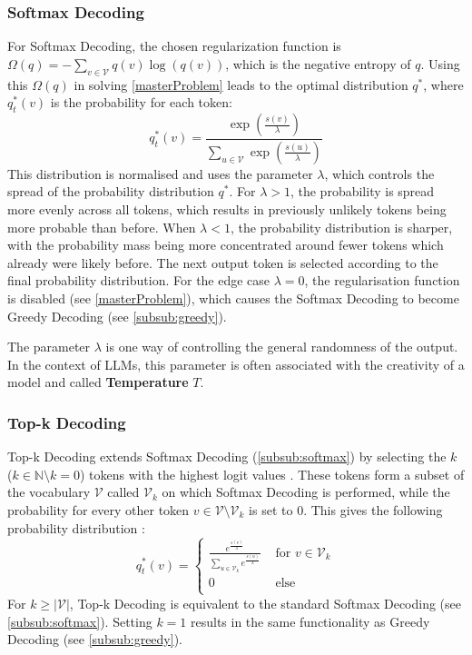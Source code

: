 \documentclass[
	fontsize = 11pt,
	paper = a4,
	draft = false,
	twoside = true,
	titlepage = false
]{scrartcl}
\numberwithin{equation}{subsection}
\begin{document}
	\subsubsection{Softmax Decoding} \label{subsub:softmax}
	For Softmax Decoding, the chosen regularization function is $\Omega(q) = - \sum_{v \in \mathcal{V}} q(v) \log(q(v))$, which is the negative entropy of $q$. Using this $\Omega(q)$ in solving \autoref{masterProblem} leads to the optimal distribution $q^*$, where $q_t^*(v)$ is the probability for each \gls{token}: \autocite[p.~10-12]{llmDetail}
	\begin{equation}
		q_t^*(v) = \frac{\exp(\frac{s(v)}{\lambda})}{\sum_{u \in \mathcal{V}}\exp(\frac{s(u)}{\lambda})}
	\end{equation}
	This distribution is normalised and uses the parameter $\lambda$, which controls the spread of the probability distribution $q^*$. For $\lambda > 1$, the probability is spread more evenly across all \glspl{token}, which results in previously unlikely \glspl{token} being more probable than before. When $\lambda < 1$, the probability distribution is sharper, with the probability mass being more concentrated around fewer \glspl{token} which already were likely before. The next output \gls{token} is selected according to the final probability distribution.
	For the edge case $\lambda = 0$, the regularisation function is disabled (see \autoref{masterProblem}), which causes the Softmax Decoding to become Greedy Decoding (see \autoref{subsub:greedy}). \autocite[p.~10-12]{llmDetail}
	
	The parameter $\lambda$ is one way of controlling the general randomness of the output. In the context of \gls{LLM}s, this parameter is often associated with the creativity of a model and called \textbf{Temperature} $T$. \autocite[p.~10-12]{llmDetail}
	
	\subsubsection{Top-k Decoding} \label{subsub:topk}
	Top-k Decoding extends Softmax Decoding (\autoref{subsub:softmax}) by selecting the $k$ ($k \in \mathbb{N} \setminus k = 0$) \glspl{token} with the highest \gls{logit} values \autocite[p.~12]{llmDetail}. These \glspl{token} form a subset of the vocabulary $\mathcal{V}$ called $\mathcal{V}_k$ on which Softmax Decoding is performed, while the probability for every other \gls{token} $v \in \mathcal{V} \setminus \mathcal{V}_k$ is set to $0$.
	This gives the following probability distribution \autocite[p.~12]{llmDetail}:
	\begin{equation}
		q_t^*(v) = \begin{cases}
			\frac{e^{\frac{s(v)}{\lambda}}}{\sum_{u \in \mathcal{V}_k}e^{\frac{s(u)}{\lambda}}} & \text{ for } v \in \mathcal{V}_k\\
			0 & \text{ else }\\
		\end{cases}
	\end{equation}
	For $k \geq \lvert\mathcal{V}\rvert$, Top-k Decoding is equivalent to the standard Softmax Decoding (see \autoref{subsub:softmax}). Setting $k = 1$ results in the same functionality as Greedy Decoding (see \autoref{subsub:greedy}). \autocite[p.~12]{llmDetail}
	
\end{document}
